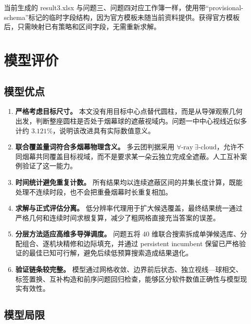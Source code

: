 当前生成的 result3.xlsx 与问题三、问题四对应工作簿一样，使用带“provisional-schema”标记的临时字段结构，因为官方模板未随当前资料提供。获得官方模板后，只需映射已有策略和区间字段，无需重新求解。

\section{模型评价}

\subsection{模型优点}

\begin{enumerate}
\item \textbf{严格考虑目标尺寸。} 本文没有用目标中心点替代圆柱，而是从导弹观察几何出发，判断整座圆柱是否处于烟幕球的遮蔽视域内。问题一中中心视线近似多计约 $3.121\%$，说明该改进具有实际数值意义。
\item \textbf{联合覆盖量词符合多烟幕物理含义。} 多云团判据采用 $\forall\text{-ray}\ \exists\text{-cloud}$，允许不同烟幕共同覆盖目标视域，而不是要求某一朵云独立完成全遮蔽。人工互补案例验证了这一能力。
\item \textbf{时间统计避免重复计数。} 所有结果均以连续遮蔽区间的并集长度计算，既能处理不连续时段，也不会把重叠烟幕时长重复相加。
\item \textbf{求解与正式评估分离。} 低分辨率代理用于扩大候选覆盖，最终结果统一通过严格几何和连续时间求根复算，减少了粗网格直接充当答案的误差。
\item \textbf{分层方法适应高维多导弹调度。} 问题五将 40 维联合搜索拆成单弹候选库、分配组合、逐机块精修和边际填充，并通过 persistent incumbent 保留已严格验证的最佳已知可行解，避免后续低预算搜索造成结果退化。
\item \textbf{验证链条较完整。} 模型通过网格收敛、边界前后状态、独立视线—球相交、标签置换、互补构造和前序问题回归检查，能够区分软件数值正确性与模型现实有效性。
\end{enumerate}

\subsection{模型局限}

